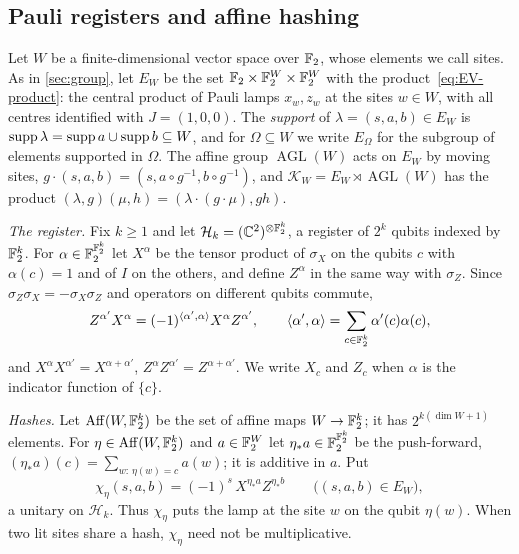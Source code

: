 \subsection{Pauli registers and affine hashing}\label{sec:upper-hash}

Let $W$ be a finite-dimensional vector space over $\mathbb F_2$, whose elements we call sites. As in \cref{sec:group}, let $E_W$ be the set
$\mathbb F_2\times\mathbb F_2^W\times\mathbb F_2^W$ with the product~\eqref{eq:EV-product}: the central product of Pauli lamps $x_w,z_w$ at the sites $w\in W$,
with all centres identified with $J=(1,0,0)$. The \emph{support} of $\lambda=(s,a,b)\in E_W$ is $\operatorname{supp}\lambda=\operatorname{supp} a\cup\operatorname{supp} b\subseteq W$,
and for $\Omega\subseteq W$ we write $E_\Omega$ for the subgroup of elements supported in $\Omega$. The affine group
$\operatorname{AGL}(W)$ acts on $E_W$ by moving sites, $g\cdot(s,a,b)=(s,a\circ g^{-1},b\circ g^{-1})$, and
$\mathcal K_W=E_W\rtimes\operatorname{AGL}(W)$ has the product $(\lambda,g)(\mu,h)=(\lambda\cdot(g\cdot\mu),gh)$.

\emph{The register.} Fix $k\ge1$ and let $\mathcal H_k=(\mathbb C^2)^{\otimes\mathbb F_2^k}$, a register of $2^k$ qubits indexed by $\mathbb F_2^k$. For
$\alpha\in\mathbb F_2^{\mathbb F_2^k}$ let $X^\alpha$ be the tensor product of $\sigma_X$ on the qubits $c$ with $\alpha(c)=1$ and of $I$ on the others,
and define $Z^\alpha$ in the same way with $\sigma_Z$. Since $\sigma_Z\sigma_X=-\sigma_X\sigma_Z$ and operators on different qubits commute,
\begin{equation}\label{eq:upper-register}
Z^{\alpha'}X^\alpha=(-1)^{\langle\alpha',\alpha\rangle}X^\alpha Z^{\alpha'},\qquad\langle\alpha',\alpha\rangle=\sum_{c\in\mathbb F_2^k}\alpha'(c)\alpha(c),
\end{equation}
and $X^\alpha X^{\alpha'}=X^{\alpha+\alpha'}$, $Z^\alpha Z^{\alpha'}=Z^{\alpha+\alpha'}$. We write $X_c$ and $Z_c$ when $\alpha$ is the
indicator function of $\{c\}$.

\emph{Hashes.} Let $\operatorname{Aff}(W,\mathbb F_2^k)$ be the set of affine maps $W\to\mathbb F_2^k$; it has $2^{k(\dim W+1)}$ elements. For
$\eta\in\operatorname{Aff}(W,\mathbb F_2^k)$ and $a\in\mathbb F_2^W$ let $\eta_*a\in\mathbb F_2^{\mathbb F_2^k}$ be the push-forward, $(\eta_*a)(c)=\sum_{w:\,\eta(w)=c}a(w)$;
it is additive in $a$. Put
\[
\chi_\eta(s,a,b)=(-1)^s\,X^{\eta_*a}Z^{\eta_*b}\qquad\bigl((s,a,b)\in E_W\bigr),
\]
a unitary on $\mathcal H_k$. Thus $\chi_\eta$ puts the lamp at the site $w$ on the qubit $\eta(w)$. When two lit sites share a hash,
$\chi_\eta$ need not be multiplicative.

